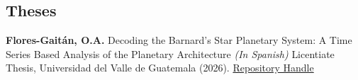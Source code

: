 \vspace{0.10cm}

\subsection*{Theses}
\begin{onecolentry}
\begin{etaremune}
    \resumePubEntry
        {\textbf{Flores-Gaitán, O.A.}}
        {Decoding the Barnard's Star Planetary System: A Time Series Based Analysis of the Planetary Architecture \textnormal{\textit{(In Spanish)}}}
        {Licentiate Thesis, Universidad del Valle de Guatemala (2026). \href{https://repositorio.uvg.edu.gt/handle/123456789/6892}{Repository Handle}}
\end{etaremune}
\end{onecolentry}
